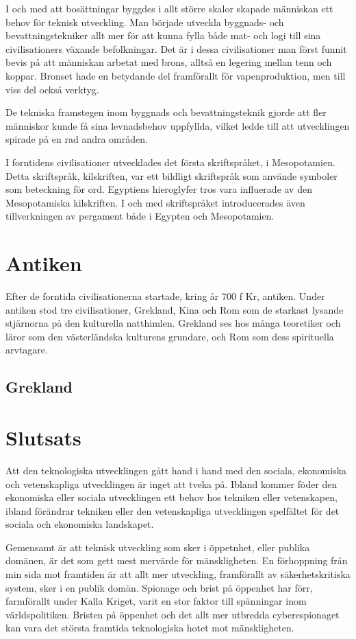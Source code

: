 \documentclass[a4paper,12pt,fleqn]{article}
\begin{document}
I och med att bosättningar byggdes i allt större skalor skapade människan ett behov för teknisk utveckling. Man började utveckla byggnads- och bevattningstekniker allt mer för att kunna fylla både mat- och logi till sina civilisationers växande befolkningar. Det är i dessa civilisationer man först funnit bevis på att människan arbetat med brons, alltså en legering mellan tenn och koppar. Bronset hade en betydande del framförallt för vapenproduktion, men till viss del också verktyg. 

De tekniska framstegen inom byggnads och bevattningsteknik gjorde att fler människor kunde få sina levnadsbehov uppfyllda, vilket ledde till att utvecklingen spirade på en rad andra områden. 

I forntidens civilisationer utvecklades det första skriftspråket, i Mesopotamien. Detta skriftspråk, kilskriften, var ett bildligt skriftspråk som använde symboler som beteckning för ord. Egyptiens hieroglyfer tros vara influerade av den Mesopotamiska kilskriften. I och med skriftspråket introducerades även tillverkningen av pergament både i Egypten och Mesopotamien. 

\newpage
\section{Antiken}

Efter de forntida civilisationerna startade, kring år 700 f Kr, antiken. Under antiken stod tre civilisationer, Grekland, Kina och Rom som de starkast lysande stjärnorna på den kulturella natthimlen. Grekland ses hos många teoretiker och läror som den västerländska kulturens grundare, och Rom som dess spirituella arvtagare. 

\subsection{Grekland}



\newpage

\section{Slutsats}

Att den teknologiska utvecklingen gått hand i hand med den sociala, ekonomiska och vetenskapliga utvecklingen är inget att tveka på. Ibland kommer föder den ekonomiska eller sociala utvecklingen ett behov hos tekniken eller vetenskapen, ibland förändrar tekniken eller den vetenskapliga utvecklingen spelfältet för det sociala och ekonomiska landskapet. 

Gemensamt är att teknisk utveckling som sker i öppetnhet, eller publika domänen, är det som gett mest mervärde för mänskligheten. En förhoppning från min sida mot framtiden är att allt mer utveckling, framförallt av säkerhetskritiska system, sker i en publik domän. Spionage och brist på öppenhet har förr, farmförallt under Kalla Kriget, varit en stor faktor till spänningar inom världspolitiken. Bristen på öppenhet och det allt mer utbredda cyberespionaget kan vara det största framtida teknologiska hotet mot mänskligheten. 
\end{document}
